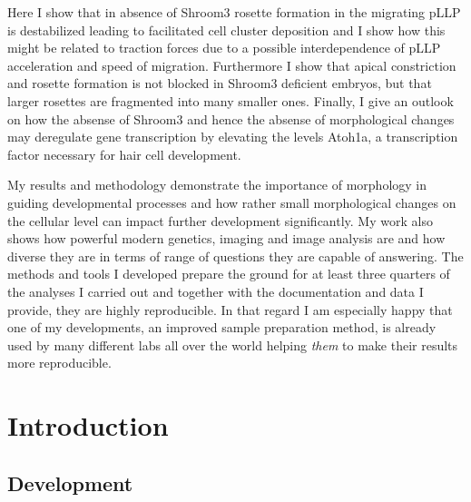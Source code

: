 \documentclass[10pt, b5paper, singlespacinge, twoside]{reedthesis} %
\theoremstyle{definition}
\theoremstyle{definition}
\theoremstyle{definition}
\theoremstyle{remark}
\begin{document}
Here I show that in absence of Shroom3 rosette formation in the migrating pLLP is destabilized leading to facilitated cell cluster deposition and I show how this might be related to traction forces due to a possible interdependence of pLLP acceleration and speed of migration. Furthermore I show that apical constriction and rosette formation is not blocked in Shroom3 deficient embryos, but that larger rosettes are fragmented into many smaller ones. Finally, I give an outlook on how the absense of Shroom3 and hence the absense of morphological changes may deregulate gene transcription by elevating the levels Atoh1a, a transcription factor necessary for hair cell development.

My results and methodology demonstrate the importance of morphology in guiding developmental processes and how rather small morphological changes on the cellular level can impact further development significantly. My work also shows how powerful modern genetics, imaging and image analysis are and how diverse they are in terms of range of questions they are capable of answering. The methods and tools I developed prepare the ground for at least three quarters of the analyses I carried out and together with the documentation and data I provide, they are highly reproducible. In that regard I am especially happy that one of my developments, an improved sample preparation method, is already used by many different labs all over the world helping \emph{them} to make their results more reproducible.

\hypertarget{Intro}{%
\chapter{Introduction}\label{Intro}}

\setcounter{page}{1}
\pagestyle{fancyplain}

\hypertarget{development}{%
\section{Development}\label{development}}
\end{document}
